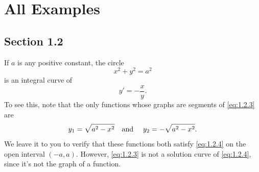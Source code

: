
\hypersetup{allcolors=black}


\chapter*{All Examples}
\makeatletter
{}
\makeatother

\section*{Section 1.2}
{}
\setcounter{chapter}{1}
\setcounter{section}{2}

\setcounter{example}{0}
\setcounter{equation}{2}
\begin{example}
  \label{example:1.2.1} \rm If $a$ is any positive constant, the circle
  \begin{equation}
    \label{eq:1.2.3}x^{2}+y^{2}=a^{2}
  \end{equation}
  is an integral curve of
  \begin{equation}
    \label{eq:1.2.4}y'=-\frac{x}{y}.
  \end{equation}
  To see this, note that the only functions whose graphs are segments of \eqref{eq:1.2.3} are
  \[
    y_{1}=\sqrt{a^{2}-x^{2}}\mbox{\quad and \quad}y_{2}=-\sqrt{a^{2}-x^{2}}.
  \]
  We leave it to you to verify that these functions both satisfy \eqref{eq:1.2.4} on the open
  interval $(-a,a)$. However, \eqref{eq:1.2.3} is not a solution curve of \eqref{eq:1.2.4}, since
  it's not the graph of a function.
\end{example}

